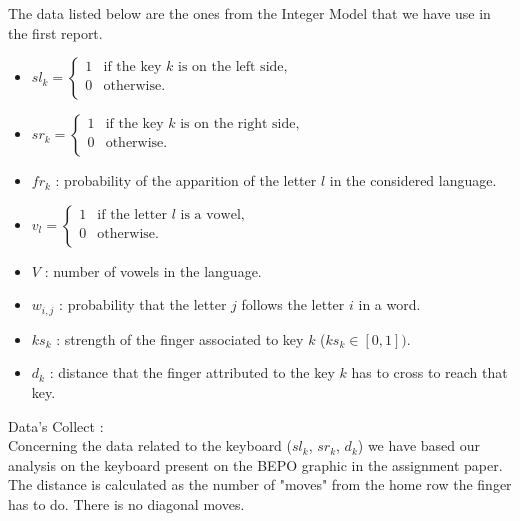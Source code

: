 \documentclass[a4paper,titlepage]{article}
\begin{document}
The data listed below are the ones from the Integer Model that we have use in the first report.
\begin{itemize}		
	\item $sl_{k} = \left\{ 
	\begin{array}{ll}
		1 & \text{if the key $k$ is on the left side,}\\
		0 & \text{otherwise.}\\
	\end{array}
	\right.$

	\item $sr_{k} = \left\{ 
	\begin{array}{ll}
		1 & \text{if the key $k$ is on the right side,}\\
		0 & \text{otherwise.}\\
	\end{array}
	\right.$

	\item $fr_k$ : probability of the apparition of the letter $l$ in the considered language.

	\item $v_{l} = \left\{ 
	\begin{array}{ll}
		1 & \text{if the letter $l$ is a vowel,}\\
		0 & \text{otherwise.}\\
	\end{array}
	\right.$

	\item $V$ : number of vowels in the language.

	\item $w_{i,j}$ : probability that the letter $j$ follows the letter $i$ in a word. 

	\item $ks_{k}$ : strength of the finger associated to key $k$ ($ks_k \in [0,1])$.

	\item $d_k$ : distance that the finger attributed to the key $k$ has to cross to reach that key.
\end{itemize}

Data's Collect : \\

Concerning the data related to the keyboard ($sl_{k}$, $sr_{k}$, $d_{k}$) we have based our analysis on the keyboard present on the BEPO graphic in the assignment paper. \\
The distance is calculated as the number of "moves" from the home row the finger has to do. There is no diagonal moves. \\
\end{document}
